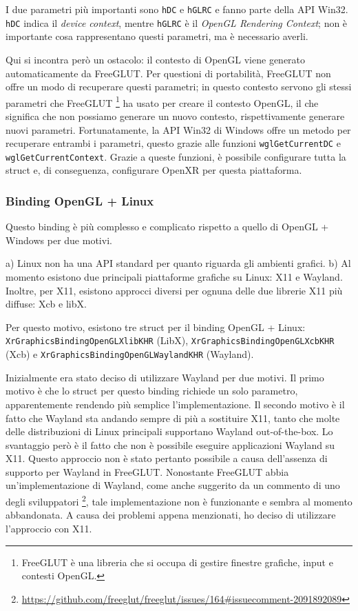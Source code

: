 \documentclass[twoside]{supsistudent}
\begin{document}
I due parametri più importanti sono \texttt{hDC} e \texttt{hGLRC} e fanno parte della API Win32. \texttt{hDC} indica il \textit{device context}, mentre \texttt{hGLRC} è il \textit{OpenGL Rendering Context}; non è importante cosa rappresentano questi parametri, ma è necessario averli.

Qui si incontra però un ostacolo: il contesto di OpenGL viene generato automaticamente da FreeGLUT. Per questioni di portabilità, FreeGLUT non offre un modo di recuperare questi parametri; in questo contesto servono gli stessi parametri che FreeGLUT \footnote{FreeGLUT è una libreria che si occupa di gestire finestre grafiche, input e contesti OpenGL.} ha usato per creare il contesto OpenGL, il che significa che non possiamo generare un nuovo contesto, rispettivamente generare nuovi parametri. Fortunatamente, la API Win32 di Windows offre un metodo per recuperare entrambi i parametri, questo grazie alle funzioni \texttt{wglGetCurrentDC} e \texttt{wglGetCurrentContext}. Grazie a queste funzioni, è possibile configurare tutta la struct e, di conseguenza, configurare OpenXR per questa piattaforma.

\subsubsection{Binding OpenGL + Linux}

Questo binding è più complesso e complicato rispetto a quello di OpenGL + Windows per due motivi.

a) Linux non ha una API standard per quanto riguarda gli ambienti grafici. b) Al momento esistono due principali piattaforme grafiche su Linux: X11 e Wayland. Inoltre, per X11, esistono approcci diversi per ognuna delle due librerie X11 più diffuse: Xcb e libX.

Per questo motivo, esistono tre struct per il binding OpenGL + Linux: \texttt{XrGraphicsBindingOpenGLXlibKHR} (LibX), \texttt{XrGraphicsBindingOpenGLXcbKHR} (Xcb) e \texttt{XrGraphicsBindingOpenGLWaylandKHR} (Wayland).

Inizialmente era stato deciso di utilizzare Wayland per due motivi. Il primo motivo è che lo struct per questo binding richiede un solo parametro, apparentemente rendendo più semplice l'implementazione. Il secondo motivo è il fatto che Wayland sta andando sempre di più a sostituire X11, tanto che molte delle distribuzioni di Linux principali supportano Wayland out-of-the-box. Lo svantaggio però è il fatto che non è possibile eseguire applicazioni Wayland su X11. Questo approccio non è stato pertanto possibile a causa dell'assenza di supporto per Wayland in FreeGLUT. Nonostante FreeGLUT abbia un'implementazione di Wayland, come anche suggerito da un commento di uno degli sviluppatori \footnote{\url{https://github.com/freeglut/freeglut/issues/164\#issuecomment-2091892089}}, tale implementazione non è funzionante e sembra al momento abbandonata. A causa dei problemi appena menzionati, ho deciso di utilizzare l'approccio con X11.
\end{document}
